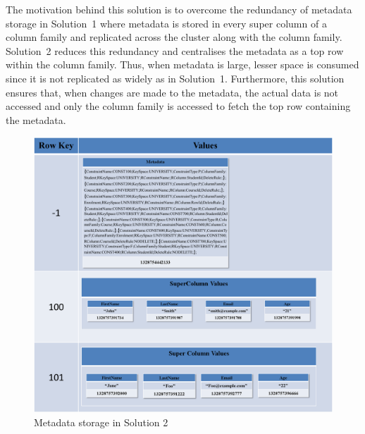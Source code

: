 The motivation behind this solution is to overcome the redundancy of metadata
storage in Solution~1 where  metadata is stored in every super column
of a column family and replicated across the cluster along with the column
family.  Solution~2 reduces this redundancy and centralises the metadata as a top
row within the column family.  Thus,  when metadata is large, lesser space is
consumed since it is not replicated as widely as in Solution~1. 
Furthermore,  this solution  ensures that, when changes are made to the
metadata, the actual data is not accessed and only the
column family  is accessed to fetch the top row containing the metadata. 

\newpage

\begin{figure}[H]  
		\centering 
		\includegraphics[width=1\textwidth]{./figure/Solutions/Sol2-MD-ColumnFamily.png}
		\caption{Metadata storage in Solution 2}\label{fd:Metadata-Solution2}
	\end{figure}







